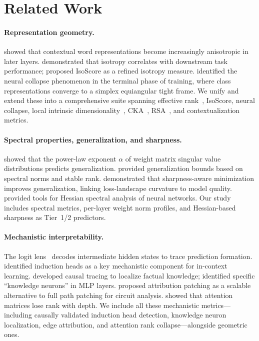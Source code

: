 \documentclass{article}
\begin{document}
\section{Related Work}
\label{sec:related}

\paragraph{Representation geometry.}
\citet{ethayarajh2019contextual} showed that contextual word representations become increasingly anisotropic in later layers.
\citet{cai2021isotropy} demonstrated that isotropy correlates with downstream task performance; \citet{rudman2022isoscore} proposed IsoScore as a refined isotropy measure.
\citet{papyan2020prevalence} identified the neural collapse phenomenon in the terminal phase of training, where class representations converge to a simplex equiangular tight frame.
We unify and extend these into a comprehensive suite spanning effective rank~\citep{roy2007effective}, IsoScore, neural collapse, local intrinsic dimensionality~\citep{levina2004maximum}, CKA~\citep{kornblith2019similarity}, RSA~\citep{kriegeskorte2008representational}, and contextualization metrics.

\paragraph{Spectral properties, generalization, and sharpness.}
\citet{martin2021implicit} showed that the power-law exponent $\alpha$ of weight matrix singular value distributions predicts generalization.
\citet{bartlett2017spectrally} provided generalization bounds based on spectral norms and stable rank.
\citet{foret2021sharpness} demonstrated that sharpness-aware minimization improves generalization, linking loss-landscape curvature to model quality.
\citet{yao2020pyhessian} provided tools for Hessian spectral analysis of neural networks.
Our study includes spectral metrics, per-layer weight norm profiles, and Hessian-based sharpness as Tier~1/2 predictors.

\paragraph{Mechanistic interpretability.}
The logit lens~\citep{nostalgebraist2020logitlens} decodes intermediate hidden states to trace prediction formation.
\citet{olsson2022context} identified induction heads as a key mechanistic component for in-context learning.
\citet{meng2022locating} developed causal tracing to localize factual knowledge;
\citet{dai2022knowledge} identified specific ``knowledge neurons'' in MLP layers.
\citet{syed2023attribution} proposed attribution patching as a scalable alternative to full path patching for circuit analysis.
\citet{dong2021attention} showed that attention matrices lose rank with depth.
We include all these mechanistic metrics---including causally validated induction head detection, knowledge neuron localization, edge attribution, and attention rank collapse---alongside geometric ones.
\end{document}
